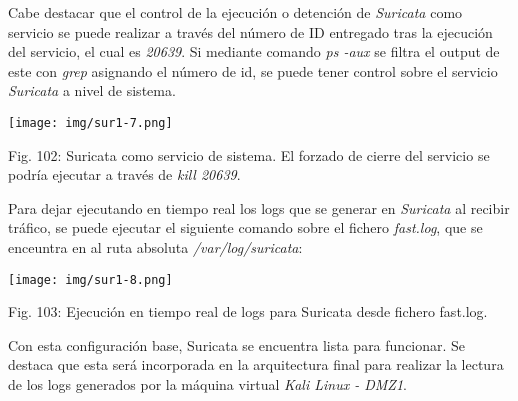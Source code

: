 \documentclass[12pt,oneside,a4paper]{book}
\begin{document}
\vspace{2em}

\hspace{20pt}
Cabe destacar que el control de la ejecución o detención de \textit{Suricata} como servicio se puede realizar a través del número de ID entregado tras la ejecución del servicio, el cual es \textit{20639}. Si mediante comando \textit{ps -aux} se filtra el output de este con \textit{grep} asignando el número de id, se puede tener control sobre el servicio \textit{Suricata} a nivel de sistema. 

\vspace{2em}

\begin{center}
    \texttt{[image: img/sur1-7.png]}
    
\vspace{0.1em}
    
    Fig. 102: Suricata como servicio de sistema. El forzado de cierre del servicio se podría ejecutar a través de \textit{kill 20639}.
\end{center}

\vspace{2em}

\hspace{20pt}
Para dejar ejecutando en tiempo real los logs que se generar en \textit{Suricata} al recibir tráfico, se puede ejecutar el siguiente comando sobre el fichero \textit{fast.log}, que se enceuntra en al ruta absoluta \textit{/var/log/suricata}:

\vspace{2em}

\begin{center}
    \texttt{[image: img/sur1-8.png]}
    
\vspace{0.1em}
    
    Fig. 103: Ejecución en tiempo real de logs para Suricata desde fichero fast.log.
\end{center}

\vspace{2em}

\hspace{20pt}
Con esta configuración base, Suricata se encuentra lista para funcionar. Se destaca que esta será incorporada en la arquitectura final para realizar la lectura de los logs generados por la máquina virtual \textit{Kali Linux - DMZ1}.

\newpage
\end{document}
